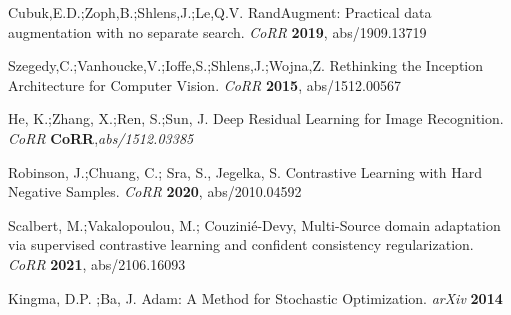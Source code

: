 \begin{thebibliography}{999}
Cubuk,E.D.;Zoph,B.;Shlens,J.;Le,Q.V. RandAugment: Practical data augmentation with no separate search. {\em CoRR} {\bf 2019}, {abs/1909.13719}

Szegedy,C.;Vanhoucke,V.;Ioffe,S.;Shlens,J.;Wojna,Z. Rethinking the Inception Architecture for Computer Vision. {\em CoRR} {\bf 2015}, {abs/1512.00567}

He, K.;Zhang, X.;Ren, S.;Sun, J. Deep Residual Learning for Image Recognition. {\em CoRR} {\bf CoRR},{\em abs/1512.03385}

Robinson, J.;Chuang, C.; Sra, S., Jegelka, S. Contrastive Learning with Hard Negative Samples. {\em CoRR} {\bf 2020}, {abs/2010.04592}

Scalbert, M.;Vakalopoulou, M.; Couzinié-Devy, Multi-Source domain adaptation via supervised contrastive learning
and confident consistency regularization. {\em CoRR} {\bf 2021}, {abs/2106.16093}

Kingma, D.P. ;Ba, J. Adam: A Method for Stochastic Optimization. {\em arXiv} {\bf 2014}









\end{thebibliography}
